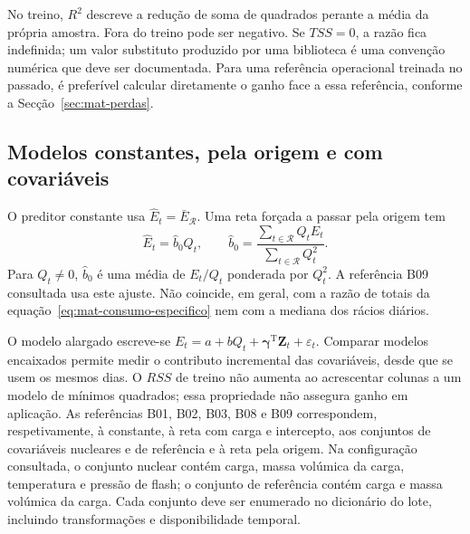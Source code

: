 No treino, $R^2$ descreve a redução de soma de quadrados perante a média da própria amostra. Fora do treino pode ser negativo. Se $TSS=0$, a razão fica indefinida; um valor substituto produzido por uma biblioteca é uma convenção numérica que deve ser documentada. Para uma referência operacional treinada no passado, é preferível calcular diretamente o ganho face a essa referência, conforme a Secção~\ref{sec:mat-perdas}.


\subsection{Modelos constantes, pela origem e com covariáveis}
\label{sec:mat-modelos-comparadores}
O preditor constante usa $\widehat E_t=\bar E_{\mathcal R}$. Uma reta forçada a passar pela origem tem
\begin{equation}
\widehat E_t=\widehat b_0Q_t,
\qquad \widehat b_0=\frac{\sum_{t\in\mathcal R}Q_tE_t}{\sum_{t\in\mathcal R}Q_t^2}.
\label{eq:mat-origem}
\end{equation}
Para $Q_t\neq0$, $\widehat b_0$ é uma média de $E_t/Q_t$ ponderada por $Q_t^2$. A referência B09 consultada usa este ajuste. Não coincide, em geral, com a razão de totais da equação~\ref{eq:mat-consumo-especifico} nem com a mediana dos rácios diários.

O modelo alargado escreve-se $E_t=a+bQ_t+\boldsymbol\gamma^{\mathrm T}\boldsymbol Z_t+\varepsilon_t$. Comparar modelos encaixados permite medir o contributo incremental das covariáveis, desde que se usem os mesmos dias. O $RSS$ de treino não aumenta ao acrescentar colunas a um modelo de mínimos quadrados; essa propriedade não assegura ganho em aplicação. As referências B01, B02, B03, B08 e B09 correspondem, respetivamente, à constante, à reta com carga e intercepto, aos conjuntos de covariáveis nucleares e de referência e à reta pela origem. Na configuração consultada, o conjunto nuclear contém carga, massa volúmica da carga, temperatura e pressão de flash; o conjunto de referência contém carga e massa volúmica da carga. Cada conjunto deve ser enumerado no dicionário do lote, incluindo transformações e disponibilidade temporal.


